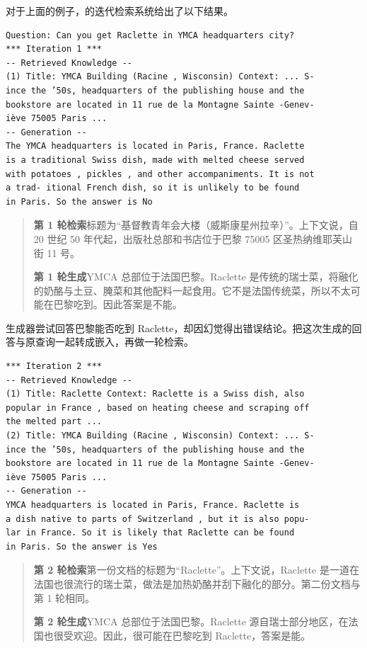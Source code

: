 对于上面的例子，的迭代检索系统给出了以下结果。

\begin{lstlisting}[nolol=true]
Question: Can you get Raclette in YMCA headquarters city?
*** Iteration 1 ***
-- Retrieved Knowledge --
(1) Title: YMCA Building (Racine , Wisconsin) Context: ... S-
ince the ’50s, headquarters of the publishing house and the
bookstore are located in 11 rue de la Montagne Sainte -Genev-
iève 75005 Paris ...
-- Generation --
The YMCA headquarters is located in Paris, France. Raclette
is a traditional Swiss dish, made with melted cheese served
with potatoes , pickles , and other accompaniments. It is not
a trad- itional French dish, so it is unlikely to be found
in Paris. So the answer is No
\end{lstlisting}

\begin{quote}\small
\textbf{第 1 轮检索}\quad 标题为“基督教青年会大楼（威斯康星州拉辛）”。上下文说，自 20 世纪 50 年代起，出版社总部和书店位于巴黎 75005 区圣热纳维耶芙山街 11 号。

\textbf{第 1 轮生成}\quad YMCA 总部位于法国巴黎。Raclette 是传统的瑞士菜，将融化的奶酪与土豆、腌菜和其他配料一起食用。它不是法国传统菜，所以不太可能在巴黎吃到。因此答案是不能。
\end{quote}

生成器尝试回答巴黎能否吃到 Raclette，却因幻觉得出错误结论。把这次生成的回答与原查询一起转成嵌入，再做一轮检索。

\begin{lstlisting}[nolol=true]
*** Iteration 2 ***
-- Retrieved Knowledge --
(1) Title: Raclette Context: Raclette is a Swiss dish, also
popular in France , based on heating cheese and scraping off
the melted part ...
(2) Title: YMCA Building (Racine , Wisconsin) Context: ... S-
ince the ’50s, headquarters of the publishing house and the
bookstore are located in 11 rue de la Montagne Sainte -Genev-
iève 75005 Paris ...
-- Generation --
YMCA headquarters is located in Paris, France. Raclette is
a dish native to parts of Switzerland , but it is also popu-
lar in France. So it is likely that Raclette can be found
in Paris. So the answer is Yes
\end{lstlisting}

\begin{quote}\small
\textbf{第 2 轮检索}\quad 第一份文档的标题为“Raclette”。上下文说，Raclette 是一道在法国也很流行的瑞士菜，做法是加热奶酪并刮下融化的部分。第二份文档与第 1 轮相同。

\textbf{第 2 轮生成}\quad YMCA 总部位于法国巴黎。Raclette 源自瑞士部分地区，在法国也很受欢迎。因此，很可能在巴黎吃到 Raclette，答案是能。
\end{quote}

